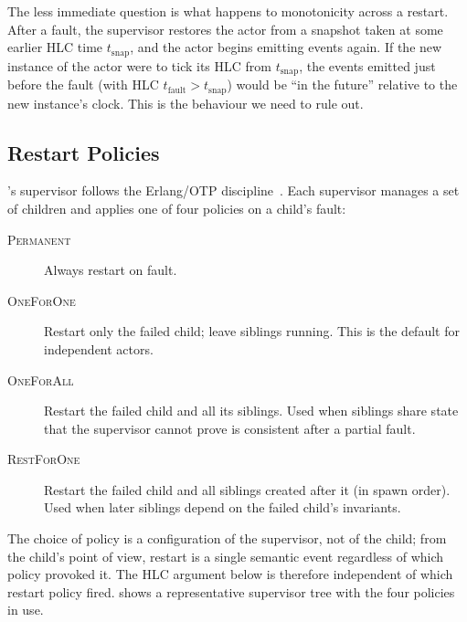 The less immediate question is what happens to monotonicity across
a restart.  After a fault, the supervisor restores the actor from
a snapshot taken at some earlier HLC time \(t_{\mathrm{snap}}\),
and the actor begins emitting events again.  If the new instance
of the actor were to tick its HLC from \(t_{\mathrm{snap}}\), the
events emitted just before the fault (with HLC
\(t_{\mathrm{fault}} > t_{\mathrm{snap}}\)) would be ``in the
future'' relative to the new instance's clock.  This is the
behaviour we need to rule out.

\subsection{Restart Policies}
\label{sec:supervision:policies}

\system{}'s supervisor follows the Erlang/OTP
discipline~\citep{armstrong2007erlang}.  Each supervisor manages a
set of children and applies one of four policies on a child's fault:

\begin{description}
\item[\textsc{Permanent}] Always restart on fault.
\item[\textsc{OneForOne}] Restart only the failed child; leave
siblings running.  This is the default for independent actors.
\item[\textsc{OneForAll}] Restart the failed child and all its
siblings.  Used when siblings share state that the supervisor cannot
prove is consistent after a partial fault.
\item[\textsc{RestForOne}] Restart the failed child and all
siblings created after it (in spawn order).  Used when later
siblings depend on the failed child's invariants.
\end{description}

The choice of policy is a configuration of the supervisor, not of the
child; from the child's point of view, restart is a single semantic
event regardless of which policy provoked it.  The HLC argument below
is therefore independent of which restart policy fired.
 shows a representative supervisor tree
with the four policies in use.

